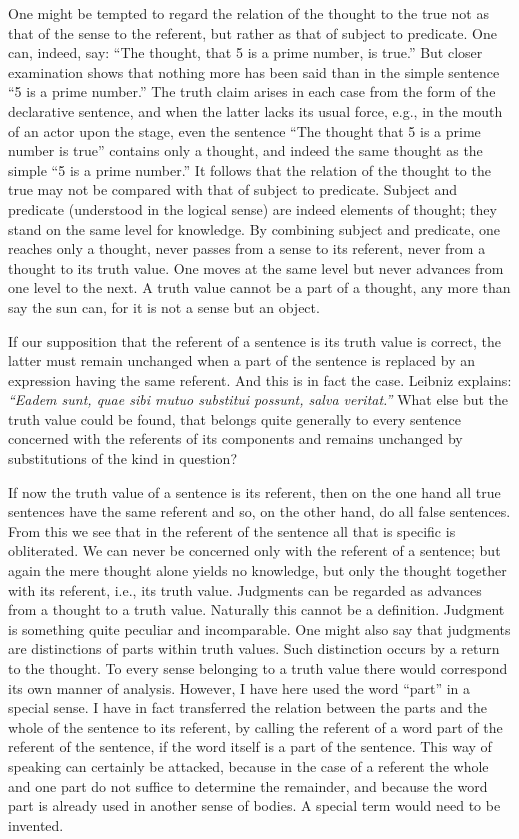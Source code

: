 \documentclass[twoside,12pt]{article}
\begin{document}
One might be tempted to regard the relation of the thought to the true
not as that of the sense to the referent, but rather as that of
subject to predicate. One can, indeed, say: ``The thought, that 5 is a
prime number, is true.'' But closer examination shows that nothing
more has been said than in the simple sentence ``5 is a prime
number.'' The truth claim arises in each case from the form of the
declarative sentence, and when the latter lacks its usual force, e.g.,
in the mouth of an actor upon the stage, even the sentence ``The
thought that 5 is a prime number is true'' contains only a thought,
and indeed the same thought as the simple ``5 is a prime number.'' It
follows that the relation of the thought to the true may not be
compared with that of subject to predicate.  Subject
and predicate (understood in the logical sense) are indeed elements of
thought; they stand on the same level for knowledge. By combining
subject and predicate, one reaches only a thought, never passes from a
sense to its referent, never from a thought to its truth value. One
moves at the same level but never advances from one level to the next.
A truth value cannot be a part of a thought, any more than say the sun
can, for it is not a sense but an object.

If our supposition that the referent of a sentence is its truth value
is correct, the latter must remain unchanged when a part of the
sentence is replaced by an expression having the same referent. And
this is in fact the case. Leibniz explains: {\it ``Eadem sunt, quae
  sibi mutuo substitui possunt, salva veritat.''} What else but the
truth value could be found, that belongs quite generally to every
sentence concerned with the referents of its components and remains
unchanged by substitutions of the kind in question?

If now the truth value of a sentence is its referent, then on the one
hand all true sentences have the same referent and so, on the other
hand, do all false sentences. From this we see that in the referent of
the sentence all that is specific is obliterated. We can never be
concerned only with the referent of a sentence; but again the mere
thought alone yields no knowledge, but only the thought together with
its referent, i.e., its truth value. Judgments can be regarded as
advances from a thought to a truth value. Naturally this cannot be a
definition. Judgment is something quite peculiar and incomparable. One
might also say that judgments are distinctions of parts within truth
values. Such distinction occurs by a return to the thought. To every
sense belonging to a truth value there would correspond its own manner
of analysis. However, I have here used the word ``part'' in a special
sense. I have in fact transferred the relation between the parts and
the whole of the sentence to its referent, by calling the referent of
a word part of the referent of the sentence, if the word itself is a
part of the sentence. This way of speaking can certainly be attacked,
because in the case of a referent the whole and one part do not
suffice to determine the remainder, and because the word part is
already used in another sense of bodies. A special term would need to
be invented.
\end{document}
